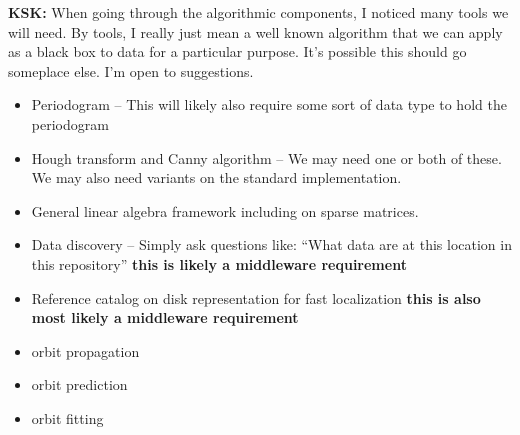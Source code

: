\begin{draftnote}[Tools]

\textbf{KSK:} When going through the algorithmic components, I noticed many tools we will need.  By tools, I really just mean a well known algorithm that we can apply as a black box to data for a particular purpose. It's possible this should go someplace else.  I'm open to suggestions.

\begin{itemize}
\item Periodogram -- This will likely also require some sort of data type to hold the periodogram
\item Hough transform and Canny algorithm -- We may need one or both of these.  We may also need variants on the standard implementation.
\item General linear algebra framework including on sparse matrices.
\item Data discovery -- Simply ask questions like: ``What data are at this location in this repository'' \textbf{this is likely a middleware requirement}
\item Reference catalog on disk representation for fast localization \textbf{this is also most likely a middleware requirement}
\item orbit propagation
\item orbit prediction
\item orbit fitting
\end{itemize}

\end{draftnote}

